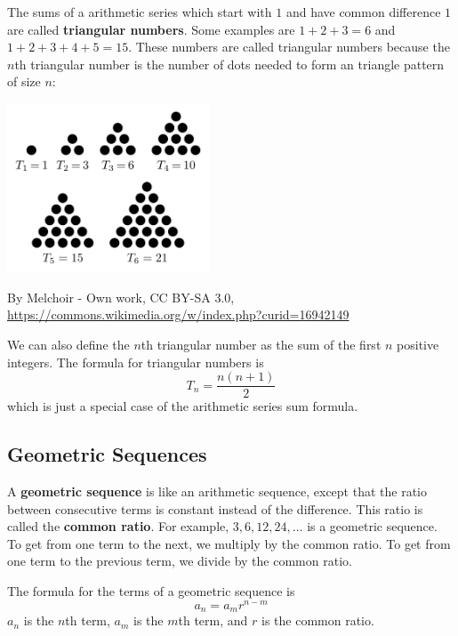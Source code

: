 \documentclass{article}
\begin{document}
    The sums of a arithmetic series which start with $1$ and have common
    difference $1$ are called \textbf{triangular numbers}. Some examples are $1
    + 2 + 3 = 6$ and $1 + 2 + 3 + 4 + 5 = 15$. These numbers are called
    triangular numbers because the $n$th triangular number is the number of dots
    needed to form an triangle pattern of size $n$:
    \begin{center}
        \includegraphics[width=6cm]{triangular_numbers}

        By Melchoir - Own work, CC BY-SA 3.0,
        \url{https://commons.wikimedia.org/w/index.php?curid=16942149}
    \end{center}
    We can also define the $n$th triangular number as the sum of the first $n$
    positive integers. The formula for triangular numbers is
    \[T_n = \frac{n(n + 1)}{2}\] which is just a special case of the arithmetic
    series sum formula.

    \subsection*{Geometric Sequences}
    A \textbf{geometric sequence} is like an arithmetic sequence, except that
    the ratio between consecutive terms is constant instead of the difference.
    This ratio is called the \textbf{common ratio}. For example, $3, 6, 12, 24,
    \dots$ is a geometric sequence. To get from one term to the next, we
    multiply by the common ratio. To get from one term to the previous term, we
    divide by the common ratio.

    The formula for the terms of a geometric sequence is
    \[a_n = a_mr^{n - m}\] $a_n$ is the $n$th term, $a_m$ is the $m$th term, and
    $r$ is the common ratio.
\end{document}
